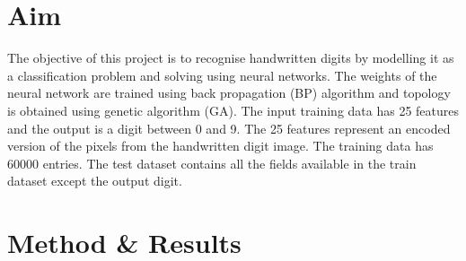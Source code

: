 

\section{Aim}
The objective of this project is to recognise handwritten digits by modelling it as a classification problem and solving using neural networks. The weights of the neural network are trained using back propagation (BP) algorithm and topology is obtained using genetic algorithm (GA).  The input training data has 25 features and the output is a digit between 0 and 9. The 25 features represent an encoded version of the pixels from the handwritten digit image. The training data has 60000 entries. The test dataset contains all the fields available in the train dataset except the output digit.
\section{Method \& Results}
